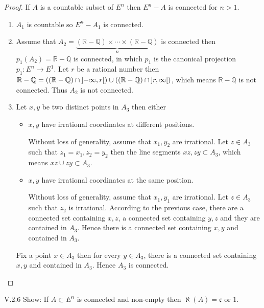 \begin{proof}
	If \( A \) is a countable subset of \( E^{n} \) then \( E^{n} - A \) is connected for \( n > 1 \).
	\begin{enumerate}[label={(\alph*)}]
		\item \( A_{1} \) is countable so \( E^{n} - A_{1} \) is connected.
		\item Assume that \( A_{2} = \underbrace{(\mathbb{R} - \mathbb{Q}) \times \cdots \times (\mathbb{R} - \mathbb{Q})}_{n} \) is connected then \( p_{1}(A_{2}) = \mathbb{R} - \mathbb{Q} \) is connected, in which \( p_{1} \) is the canonical projection \( p_{1}: E^{n} \to E^{1} \). Let \( r \) be a rational number then \( \mathbb{R} - \mathbb{Q} = ((\mathbb{R} - \mathbb{Q}) \cap \left\rbrack{-\infty, r}\right\lbrack) \cup ((\mathbb{R} - \mathbb{Q}) \cap \left\rbrack{r, \infty}\right\lbrack) \), which means \( \mathbb{R} - \mathbb{Q} \) is not connected. Thus \( A_{2} \) is not connected.
		\item Let \( x, y \) be two distinct points in \( A_{3} \) then either
		      \begin{itemize}
			      \item \( x, y \) have irrational coordinates at different positions.

			            Without loss of generality, assume that \( x_{1}, y_{2} \) are irrational. Let \( z \in A_{3} \) such that \( z_{1} = x_{1}, z_{2} = y_{2} \) then the line segments \( xz, zy \subset A_{3} \), which means \( xz \cup zy \subset A_{3} \).
			      \item \( x, y \) have irrational coordinates at the same position.

			            Without loss of generality, assume that \( x_{1}, y_{1} \) are irrational. Let \( z \in A_{3} \) such that \( z_{2} \) is irrational. According to the previous case, there are a connected set containing \( x, z \), a connected set containing \( y, z \) and they are contained in \( A_{3} \). Hence there is a connected set containing \( x, y \) and contained in \( A_{3} \).
		      \end{itemize}

		      Fix a point \( x \in A_{3} \) then for every \( y \in A_{3} \), there is a connected set containing \( x, y \) and contained in \( A_{3} \). Hence \( A_{3} \) is connected.
	\end{enumerate}
\end{proof}

\begin{problem}{V.2.6}
Show: If \( A \subset E^{n} \) is connected and non-empty then \( \aleph(A) = \mathfrak{c} \) or \(1\).
\end{problem}

